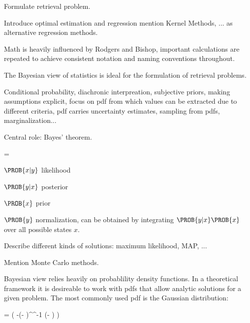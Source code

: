 Formulate retrieval problem.

Introduce optimal estimation and regression mention Kernel Methods, ... as
alternative regression methods.

Math is heavily influenced by Rodgers and Bishop, important calculations are
repeated to achieve consistent notation and naming conventions throughout.

\startsection[title={Bayesian Statistics}]

    The Bayesian view of statistics is ideal for the formulation of retrieval
    problems. 

    Conditional probability, diachronic interpreation, subjective priors,
    making assumptions explicit, focus on pdf from which values can be
    extracted due to different criteria, pdf carries uncertainty estimates,
    sampling from pdfs, marginalization...

    Central role: Bayes' theorem.
    
    \startformula
         = 
    \stopformula

    $\PROB{x|y}$ likelihood

    $\PROB{y|x}$ posterior

    $\PROB{x}$ prior

    $\PROB{y}$ normalization, can be obtained by integrating $\PROB{y|x}\PROB{x}$
    over all possible states $x$.

     {}

    Describe different kinds of solutions: maximum likelihood, MAP, ...

    Mention Monte Carlo methods.

\stopsection

\startsection[title=The Multivariate Gaussian Distribution]

    Bayesian view relies heavily on probablility density functions. In a
    theoretical framework it is desireable to work with pdfs that allow
    analytic solutions for a given problem. The most commonly used pdf is the
    Gaussian distribution:

    \placeformula[eq:gaussian]
    \startformula
        \GAUSS{\VECX}{\MEANVEC}{\COVMAT}
        = 
          \exp \left( -(\VECX - \MEANVEC)^\top \COVMAT^{-1} (\VECX - \MEANVEC) \right)
    \stopformula

